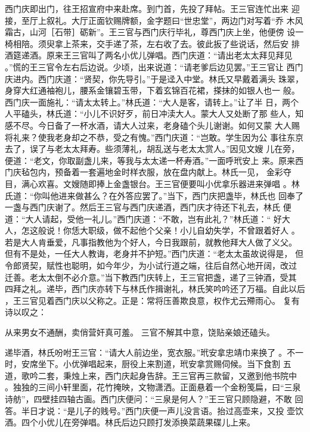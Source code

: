 西门庆即出门，往王招宣府中来赴席。到门首，先投了拜帖。王三官连忙出来
迎接，至厅上叙礼。大厅正面钦赐牌额，金字题曰“世忠堂”，两边门对写着“乔
木风霜古，山河［石带］砺新”。王三官与西门庆行毕礼，尊西门庆上坐，他便傍
设一椅相陪。须臾拿上茶来，交手递了茶，左右收了去。彼此扳了些说话，然后安
排酒筵递酒。原来王三官叫了两名小优儿弹唱。西门庆道：“请出老太太拜见拜见
。”慌的王三官令左右后边说。少顷，出来说道：“请老爹后边见罢。”王三官让
西门庆进内。西门庆道：“贤契，你先导引。”于是迳入中堂。林氏又早戴着满头
珠翠，身穿大红通袖袍儿，腰系金镶碧玉带，下着玄锦百花裙，搽抹的如银人也一
般。西门庆一面施礼：“请太太转上。”林氏道：“大人是客，请转上。”让了半
日，两个人平磕头，林氏道：“小儿不识好歹，前日冲渎大人。蒙大人又处断了那
些人，知感不尽。今日备了一杯水酒，请大人过来，老身磕个头儿谢谢。如何又蒙
大人赐将礼来？使我老身却之不恭，受之有愧。”西门庆道：“岂敢。学生因为公
事往东京去了，误了与老太太拜寿。些须薄礼，胡乱送与老太太赏人。”因见文嫂
儿在旁，便道：“老文，你取副盏儿来，等我与太太递一杯寿酒。”一面呼玳安上
来。原来西门庆毡包内，预备着一套遍地金时样衣服，放在盘内献上。林氏一见，
金彩夺目，满心欢喜。文嫂随即捧上金盏银台。王三官便要叫小优拿乐器进来弹唱
。林氏道：“你叫他进来做甚么？在外答应罢了。”当下，西门庆把盏毕，林氏也
回奉了一盏与西门庆谢了。然后王三官与西门庆递酒，西门庆才待还下礼去，林氏
便道：“大人请起，受他一礼儿。”西门庆道：“不敢，岂有此礼？”林氏道：“
好大人，怎这般说！你恁大职级，做不起他个父亲！小儿自幼失学，不曾跟着好人
。若是大人肯垂爱，凡事指教他为个好人，今日我跟前，就教他拜大人做了义父。
但有不是处，一任大人教诲，老身并不护短。”西门庆道：“老太太虽故说得是，
但令郎贤契，赋性也聪明，如今年少，为小试行道之端，往后自然心地开阔，改过
迁善。老太太倒不必介意。”当下教西门庆转上，王三官把盏，递了三钟酒，受其
四拜之礼。递毕，西门庆亦转下与林氏作揖谢礼，林氏笑吟吟还了万福。自此以后
，王三官见着西门庆以父称之。正是：常将压善欺良意，权作尤云殢雨心。
复有诗以叹之：

从来男女不通酬，卖俏营奸真可羞。
三官不解其中意，饶贴亲娘还磕头。

递毕酒，林氏吩咐王三官：“请大人前边坐，宽衣服。”玳安拿忠靖巾来换了
。不一时，安席坐下。小优弹唱起来，厨役上来割道，玳安拿赏赐伺候。当下食割
五道，歌吟二套，秉烛上来，西门庆起身告辞。王三官再三款留，又邀到他书院中
。独独的三间小轩里面，花竹掩映，文物潇洒。正面悬着一个金粉笺扁，曰“三泉
诗舫”，四壁挂四轴古画。西门庆便问：“三泉是何人？”王三官只顾隐避，不敢
回答。半日才说：“是儿子的贱号。”西门庆便一声儿没言语。抬过高壶来，又投
壶饮酒。四个小优儿在旁弹唱。林氏后边只顾打发添换菜蔬果碟儿上来。

